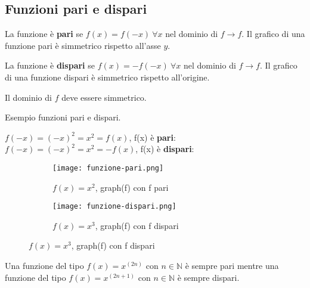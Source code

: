 \subsection{Funzioni pari e dispari}
\begin{definition}[Pari]
    La funzione è \textbf{pari} se $f(x) = f(-x) \: \forall x$ nel dominio di $f \longrightarrow f$. Il grafico di una funzione pari è simmetrico rispetto all'asse $y$.
\end{definition}
\begin{definition}[Dispari]
    La funzione è \textbf{dispari} se $f(x) = -f(-x) \: \forall x$ nel dominio di $f \longrightarrow f$. Il grafico di una funzione dispari è simmetrico rispetto all'origine.
\end{definition}
\begin{note}
    Il dominio di $f$ deve essere simmetrico.\\
\end{note}
\begin{example}
Esempio funzioni pari e dispari.\\
\end{example}
$f(-x) = (-x)^2 = x^2 = f(x)$, f(x) è \textbf{pari}: \hfill $f(-x) = (-x)^2 = x^2 = -f(x)$, f(x) è \textbf{dispari}:
\begin{figure}[h!]
    \vspace{-1pt}
    \begin{subfigure}{.5\textwidth}
        \centering
        \texttt{[image: funzione-pari.png]}
        \caption{$f(x) = x^2$, \hspace{.2cm} graph(f) con f pari}
    \end{subfigure}
    \begin{subfigure}{.5\textwidth}
        \centering
        \texttt{[image: funzione-dispari.png]}
        \caption{$f(x) = x^3$, \hspace{.2cm} graph(f) con f dispari}
    \end{subfigure}
\end{figure}
\begin{note}
	Una funzione del tipo $f(x)=x^(2n)$ con $n \in \mathbb{N}$ è sempre pari mentre una funzione del tipo $f(x)=x^(2n+1)$ con $n \in \mathbb{N}$ è sempre dispari.
\end{note}

